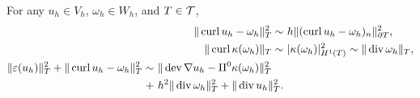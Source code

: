 \begin{lemma}\label{lemma::normequi_tech} %
  For any $u_h\in V_h$, $\omega_h\in W_h$, and  $T \in\mathcal{T}$,
    \begin{subequations} \label{eq::normequi}
    \begin{align}
      \| \curl u_h - \omega_h\|_T^2 \sim&~
                                           h \| (\curl u_h - \omega_h)_n\|_{\partial T}^2, \label{eq::normequiA}\\
      \| \curl \kappa (\omega_h) \|_T \sim&~ | \kappa (\omega_h) |_{H^1(T)}^2 \sim \| \div \omega_h \|_T,
                                              \label{eq::normequiB} \\
      \begin{split}\label{eq::normequiC}
        \| \eps (u_h) \|^2_T + \| \curl u_h - \omega_h\|_T^2 \sim&~ \| \dev \nabla u_h - \Pi^0 \kappa(\omega_h) \|_T^2 \\
        + &~ h^2 \| \div \omega_h \|_T^2 + \| \div u_h \|_T^2.  \end{split} %
    \end{align}
  \end{subequations}
\end{lemma}
